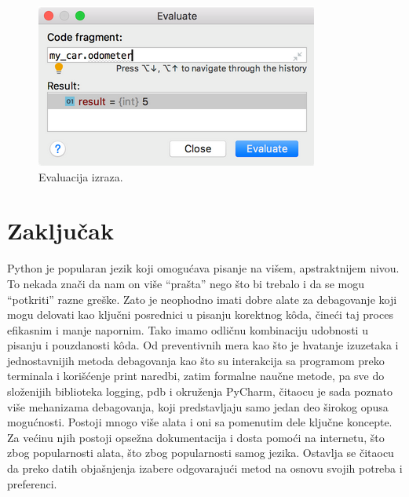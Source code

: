 \documentclass[a4paper]{article}
\begin{document}
\begin{figure}[h!]
\begin{center}
\includegraphics[scale = 0.4]{4}
\end{center}
\caption{Evaluacija izraza.}
\label{4}
\end{figure}
\section{Zaključak}
\label{sec:zakljucak}

Python je popularan jezik koji omogućava pisanje na višem, apstraktnijem nivou. To nekada znači da nam on više “prašta” nego što bi trebalo i da se mogu “potkriti” razne greške. Zato je neophodno imati dobre alate za debagovanje koji mogu delovati kao ključni posrednici u pisanju korektnog k\^{o}da, čineći taj proces efikasnim i manje napornim. Tako imamo odličnu kombinaciju udobnosti u pisanju i pouzdanosti k\^{o}da. Od preventivnih mera kao što je hvatanje izuzetaka i jednostavnijih metoda debagovanja kao što su interakcija sa programom preko terminala i korišćenje print naredbi, zatim formalne naučne metode, pa sve do složenijih biblioteka logging, pdb i okruženja PyCharm, čitaocu je sada poznato više mehanizama debagovanja, koji predstavljaju samo jedan deo širokog opusa mogućnosti. Postoji mnogo više alata i oni sa pomenutim dele ključne koncepte. Za većinu njih postoji opsežna dokumentacija i dosta pomoći na internetu, što zbog popularnosti alata, što zbog popularnosti samog jezika. Ostavlja se čitaocu da preko datih objašnjenja izabere odgovarajući metod na osnovu svojih potreba i preferenci.


\appendix
 


\newpage

\appendix
\end{document}
